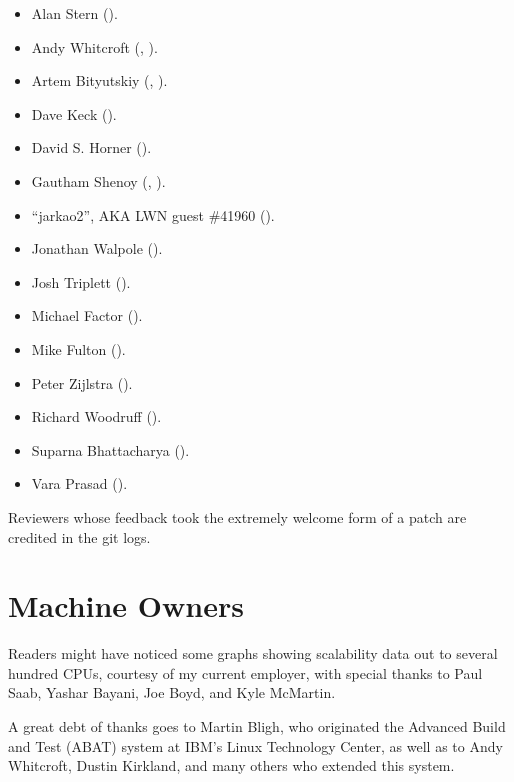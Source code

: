 \begin{itemize}
\item	Alan Stern ().
\item	Andy Whitcroft (,
	).
\item	Artem Bityutskiy (,
	).
\item	Dave Keck ().
\item	David S. Horner
	().
\item	Gautham Shenoy (,
	).
\item	``jarkao2'', AKA LWN guest \#41960 ().
\item	Jonathan Walpole ().
\item	Josh Triplett ().
\item	Michael Factor ().
\item	Mike Fulton ().
\item	Peter Zijlstra
	(). %
\item	Richard Woodruff ().
\item	Suparna Bhattacharya ().
\item	Vara Prasad
	().
\end{itemize}

Reviewers whose feedback took the extremely welcome form of a patch
are credited in the git logs.

\section{Machine Owners}

Readers might have noticed some graphs showing scalability data out
to several hundred CPUs, courtesy of my current employer, with special
thanks to Paul Saab, Yashar Bayani, Joe Boyd, and Kyle McMartin.

A great debt of thanks goes to Martin Bligh, who originated the
Advanced Build and Test (ABAT) system at IBM's Linux Technology
Center, as well as to Andy Whitcroft, Dustin Kirkland, and many
others who extended this system.

